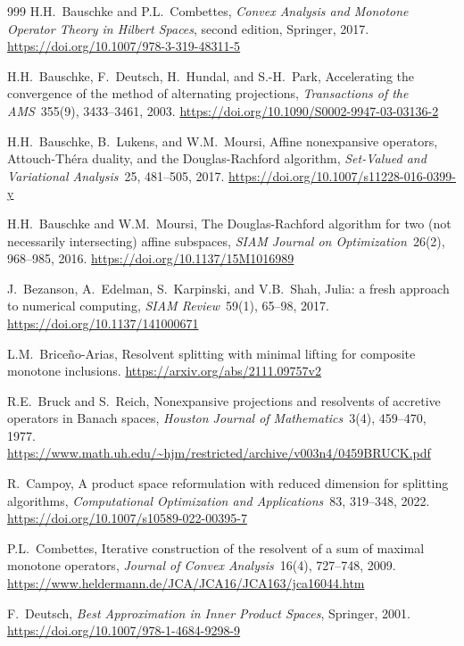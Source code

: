 \documentclass[11pt]{article}
\theoremstyle{definition}
\begin{document}
{\begin{thebibliography}{999}
H.H.\ Bauschke and P.L.\ Combettes,
\emph{Convex Analysis and Monotone Operator Theory in Hilbert Spaces},
second edition,
Springer, 2017. 
\url{https://doi.org/10.1007/978-3-319-48311-5}

H.H.\ Bauschke, F.\ Deutsch, H.\ Hundal, and S.-H.\ Park,
Accelerating the convergence of the method of alternating projections,
\emph{Transactions of the AMS}~355(9), 3433--3461, 2003.
\url{https://doi.org/10.1090/S0002-9947-03-03136-2}

H.H.\ Bauschke, B.\ Lukens, and W.M.\ Moursi,
Affine nonexpansive operators, 
Attouch-Th\'era  duality, and 
the Douglas-Rachford algorithm,
\emph{Set-Valued and Variational Analysis}~25, 481--505, 2017.
\url{https://doi.org/10.1007/s11228-016-0399-y}

H.H.\ Bauschke and W.M.\ Moursi,
The Douglas-Rachford algorithm for two
(not necessarily intersecting) affine subspaces,
\emph{SIAM Journal on Optimization}~26(2), 968--985, 2016.
\url{https://doi.org/10.1137/15M1016989}

J.\ Bezanson, A.\ Edelman, S.\ Karpinski, and V.B.\ Shah,
Julia: a fresh approach to numerical computing,
\emph{SIAM Review}~59(1), 65--98, 2017.
\url{https://doi.org/10.1137/141000671} 

L.M.\ Brice\~{n}o-Arias,
Resolvent splitting with minimal lifting for composite monotone inclusions.
\url{https://arxiv.org/abs/2111.09757v2}

R.E.\ Bruck and S.\ Reich,
Nonexpansive projections and resolvents of accretive
operators in Banach spaces,
\emph{Houston Journal of Mathematics}~3(4), 459--470, 1977.
\url{https://www.math.uh.edu/~hjm/restricted/archive/v003n4/0459BRUCK.pdf}

R.\ Campoy, 
A product space reformulation with reduced dimension for splitting algorithms, 
\emph{Computational Optimization and Applications}~83, 319--348, 2022. 
\url{https://doi.org/10.1007/s10589-022-00395-7}

P.L.\ Combettes,
Iterative construction of the resolvent of a sum of maximal
monotone operators,
\emph{Journal of Convex Analysis}~16(4), 727--748, 2009. 
\url{https://www.heldermann.de/JCA/JCA16/JCA163/jca16044.htm}


F.\ Deutsch,
\emph{Best Approximation in Inner Product Spaces},
Springer, 2001. 
\url{https://doi.org/10.1007/978-1-4684-9298-9}


\end{thebibliography}}
\end{document}
